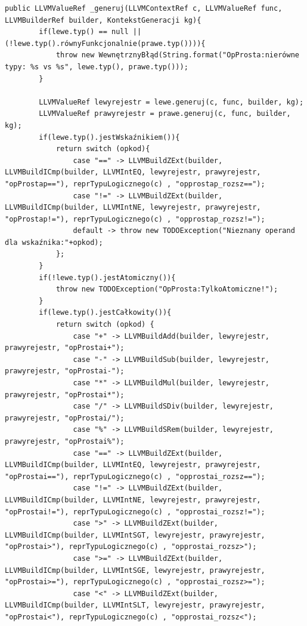 \begin{lstlisting}[basicstyle=\scriptsize]
    public LLVMValueRef _generuj(LLVMContextRef c, LLVMValueRef func, LLVMBuilderRef builder, KontekstGeneracji kg){
        if(lewe.typ() == null || (!lewe.typ().równyFunkcjonalnie(prawe.typ()))){
            throw new WewnętrznyBłąd(String.format("OpProsta:nierówne typy: %s vs %s", lewe.typ(), prawe.typ()));
        }

        LLVMValueRef lewyrejestr = lewe.generuj(c, func, builder, kg);
        LLVMValueRef prawyrejestr = prawe.generuj(c, func, builder, kg);
        if(lewe.typ().jestWskaźnikiem()){
            return switch (opkod){
                case "==" -> LLVMBuildZExt(builder, LLVMBuildICmp(builder, LLVMIntEQ, lewyrejestr, prawyrejestr, "opProstap=="), reprTypuLogicznego(c) , "opprostap_rozsz==");
                case "!=" -> LLVMBuildZExt(builder, LLVMBuildICmp(builder, LLVMIntNE, lewyrejestr, prawyrejestr, "opProstap!="), reprTypuLogicznego(c) , "opprostap_rozsz!=");
                default -> throw new TODOException("Nieznany operand dla wskaźnika:"+opkod);
            };
        }
        if(!lewe.typ().jestAtomiczny()){
            throw new TODOException("OpProsta:TylkoAtomiczne!");
        }
        if(lewe.typ().jestCałkowity()){
            return switch (opkod) {
                case "+" -> LLVMBuildAdd(builder, lewyrejestr, prawyrejestr, "opProstai+");
                case "-" -> LLVMBuildSub(builder, lewyrejestr, prawyrejestr, "opProstai-");
                case "*" -> LLVMBuildMul(builder, lewyrejestr, prawyrejestr, "opProstai*");
                case "/" -> LLVMBuildSDiv(builder, lewyrejestr, prawyrejestr, "opProstai/");
                case "%" -> LLVMBuildSRem(builder, lewyrejestr, prawyrejestr, "opProstai%");
                case "==" -> LLVMBuildZExt(builder, LLVMBuildICmp(builder, LLVMIntEQ, lewyrejestr, prawyrejestr, "opProstai=="), reprTypuLogicznego(c) , "opprostai_rozsz==");
                case "!=" -> LLVMBuildZExt(builder, LLVMBuildICmp(builder, LLVMIntNE, lewyrejestr, prawyrejestr, "opProstai!="), reprTypuLogicznego(c) , "opprostai_rozsz!=");
                case ">" -> LLVMBuildZExt(builder, LLVMBuildICmp(builder, LLVMIntSGT, lewyrejestr, prawyrejestr, "opProstai>"), reprTypuLogicznego(c) , "opprostai_rozsz>");
                case ">=" -> LLVMBuildZExt(builder, LLVMBuildICmp(builder, LLVMIntSGE, lewyrejestr, prawyrejestr, "opProstai>="), reprTypuLogicznego(c) , "opprostai_rozsz>=");
                case "<" -> LLVMBuildZExt(builder, LLVMBuildICmp(builder, LLVMIntSLT, lewyrejestr, prawyrejestr, "opProstai<"), reprTypuLogicznego(c) , "opprostai_rozsz<");

\end{lstlisting}
